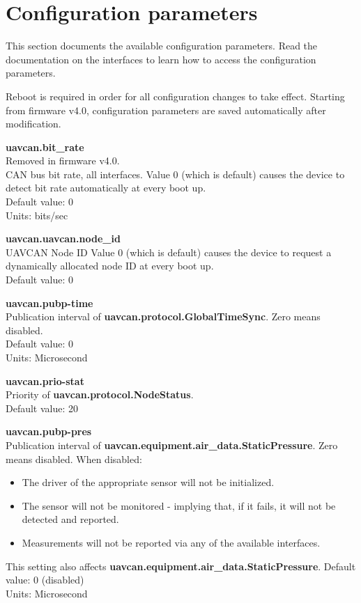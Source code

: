 \documentclass{zubaxdoc}
\begin{document}
\chapter{Configuration parameters}

This section documents the available configuration parameters. Read the documentation on the interfaces to learn how to access the configuration parameters.

Reboot is required in order for all configuration changes to take effect.
Starting from firmware v4.0, configuration parameters are saved automatically after modification.

\textbf{uavcan.bit{\_}rate}\\
Removed in firmware v4.0.\\
CAN bus bit rate, all interfaces. Value 0 (which is default) causes the device to detect bit rate automatically at every boot up.\\
Default value: 0\\
Units: bits/sec

\textbf{uavcan.uavcan.node{\_}id}\\
UAVCAN Node ID Value 0 (which is default) causes the device to request a dynamically allocated node ID at every boot up.\\
Default value: 0

\textbf{uavcan.pubp-time}\\
Publication interval of \textbf{uavcan.protocol.GlobalTimeSync}. Zero means disabled.\\
Default value: 0\\
Units: Microsecond

\textbf{uavcan.prio-stat}\\
Priority of \textbf{uavcan.protocol.NodeStatus}.\\
Default value: 20

\textbf{uavcan.pubp-pres}\\
Publication interval of \textbf{uavcan.equipment.air{\_}data.StaticPressure}. Zero means disabled. When disabled:
\begin{itemize}
\item The driver of the appropriate sensor will not be initialized.
\item The sensor will not be monitored - implying that, if it fails, it will not be detected and reported.
\item Measurements will not be reported via any of the available interfaces.
\end{itemize}
This setting also affects \textbf{uavcan.equipment.air{\_}data.StaticPressure}.
Default value: 0 (disabled)\\
Units: Microsecond
\end{document}
